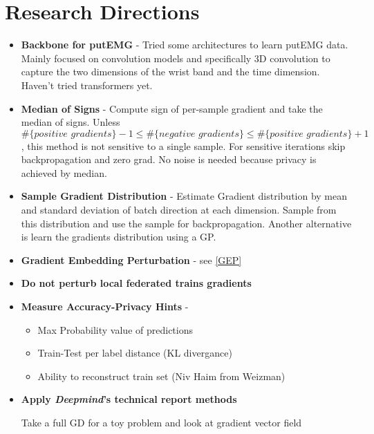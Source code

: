 
\chapter{Research Directions}
\begin{itemize}

    \item \textbf{Backbone for putEMG} - Tried some architectures to learn putEMG data. Mainly focused on convolution models and specifically 3D convolution to capture the two dimensions of the wrist band and the time dimension. Haven't tried transformers yet.

    \item \textbf{Median of Signs} -  Compute sign of per-sample gradient and take the median of signs. Unless $\#\{ \textit{positive gradients}\} - 1 \leq \#\{\textit{negative gradients}\} \leq \#\{\textit{positive gradients}\} + 1 $, this method is not sensitive to a single sample. For sensitive iterations skip backpropagation and zero grad. No noise is needed because privacy is achieved by median.

    \item \textbf{Sample Gradient Distribution} - Estimate Gradient distribution by mean and standard deviation of batch direction at each dimension. Sample from this distribution and use the sample for backpropagation. Another alternative is learn the gradients distribution using a GP.

    \item \textbf{Gradient Embedding Perturbation} - see \ref{GEP}

    \item \textbf{Do not perturb local federated trains gradients}
     

    \item  \textbf{Measure Accuracy-Privacy Hints} - 
    \begin{itemize}
        \item Max Probability value of predictions
        \item Train-Test per label distance (KL divergance)
        \item Ability to reconstruct train set (Niv Haim from Weizman)
    \end{itemize}  

    \item \textbf{Apply \textit{Deepmind}'s technical report \cite{DeUnlockingScale} methods}
    

     Take a full GD for a toy problem and look at gradient vector field
    
\end{itemize}